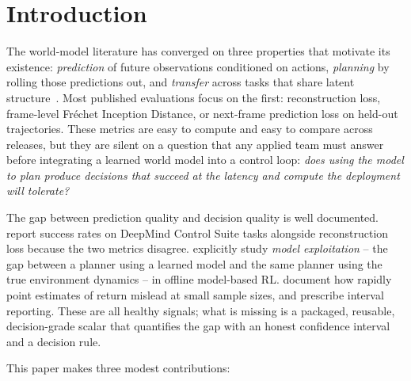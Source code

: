 \documentclass[10pt,letterpaper]{article}
\begin{document}
\begin{abstract}
comparison needs before its interval clears zero, and show that a plausible leaderboard near-tie ($0.94$ vs $0.92$ at $n = 100$) is statistically indistinguishable from noise.
\end{abstract}

\section{Introduction}

The world-model literature has converged on three properties that motivate its existence: \emph{prediction} of future observations conditioned on actions, \emph{planning} by rolling those predictions out, and \emph{transfer} across tasks that share latent structure~\citep{ha2018world,hafner2023dreamerv3,bardes2024vjepa,bruce2024genie}. Most published evaluations focus on the first: reconstruction loss, frame-level Fréchet Inception Distance, or next-frame prediction loss on held-out trajectories. These metrics are easy to compute and easy to compare across releases, but they are silent on a question that any applied team must answer before integrating a learned world model into a control loop: \emph{does using the model to plan produce decisions that succeed at the latency and compute the deployment will tolerate?}

The gap between prediction quality and decision quality is well documented. \citet{hafner2019planet} report success rates on DeepMind Control Suite tasks alongside reconstruction loss because the two metrics disagree. \citet{yu2020mopo,kidambi2020morel} explicitly study \emph{model exploitation} -- the gap between a planner using a learned model and the same planner using the true environment dynamics -- in offline model-based RL. \citet{agarwal2021precipice} document how rapidly point estimates of return mislead at small sample sizes, and prescribe interval reporting. These are all healthy signals; what is missing is a packaged, reusable, decision-grade scalar that quantifies the gap with an honest confidence interval and a decision rule.

This paper makes three modest contributions:
\end{document}
